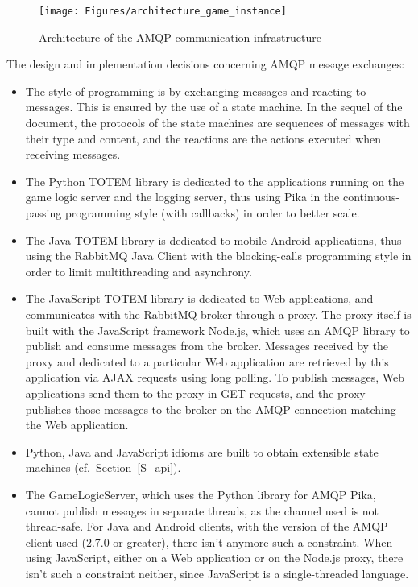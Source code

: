 \begin{figure}[htbp!]
\begin{center}
\texttt{[image: Figures/architecture\_game\_instance]}
\caption{Architecture of the AMQP communication infrastructure}
\label{F_architecture_game_instance}
\end{center}
\end{figure}

The design and implementation decisions concerning AMQP message
exchanges:
\begin{itemize}
\item The style of programming is by exchanging messages and reacting
  to messages. This is ensured by the use of a state machine. In the sequel of 
  the document, the protocols of the state
  machines are sequences of messages with their type and content, and
  the reactions are the actions executed when receiving messages.
\item The Python TOTEM library is dedicated to the
  applications running on the game logic server and the logging
  server, thus using Pika in the continuous-passing programming style
  (with callbacks) in order to better scale.
\item The Java TOTEM library is dedicated to mobile Android
  applications, thus using the \textsf{RabbitMQ} Java Client with the
  blocking-calls programming style in order to limit multithreading
  and asynchrony.
\item The JavaScript TOTEM library is dedicated to Web applications, 
and communicates with the RabbitMQ broker through a proxy. The proxy itself is 
built with the JavaScript framework \textsf{Node.js}, which uses an AMQP library
 to 
publish and consume messages from the broker. Messages received by the proxy and
dedicated to a particular Web application are retrieved by this application via
AJAX requests using long polling. To publish messages, Web 
applications send them to the proxy in GET requests, and the proxy publishes 
those messages to the broker on the AMQP connection matching the Web 
application.
\item Python, Java and JavaScript idioms are built to obtain extensible state
  machines (cf.~Section~\ref{S_api}).
\item The GameLogicServer, which uses the Python library for AMQP Pika, cannot 
publish messages in separate threads, as the channel used is not thread-safe.
For Java and Android clients, with the version of the AMQP client used 
(2.7.0 or greater), there isn't anymore such a constraint. When using JavaScript, either on a Web application or on the Node.js proxy, there isn't such a constraint neither, since JavaScript is a single-threaded language.

\end{itemize}
